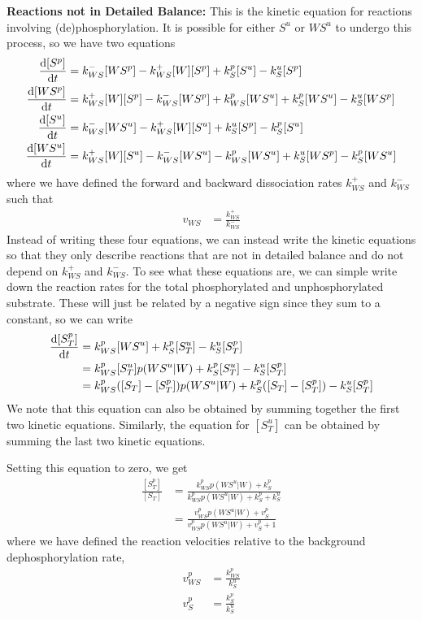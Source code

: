 \documentclass[aps,onecolumn,superscriptaddress,notitlepage]{revtex4-1}
\begin{document}
\textbf{Reactions not in  Detailed Balance:}
This is the kinetic equation for reactions involving (de)phosphorylation. 
It is possible for either $S^u$ or $WS^u$ to undergo this process, so we have two equations
\begin{align}
\dv{[S^p]}{t} &=  k_{WS}^-[WS^p] - k_{WS}^+[W][S^p] + k_S^p[S^u] - k_S^u[S^p]\\
\dv{[WS^p]}{t} &= k_{WS}^+[W][S^p] -k_{WS}^-[WS^p] + k_{WS}^p[WS^u] + k_S^p[WS^u] - k_S^u[WS^p]\\
\dv{[S^u]}{t} &=  k_{WS}^-[WS^u] - k_{WS}^+[W][S^u] + k_S^u[S^p] - k_S^p[S^u]\\
\dv{[WS^u]}{t} &= k_{WS}^+[W][S^u] -k_{WS}^-[WS^u] - k_{WS}^p[WS^u] + k_S^u[WS^p] - k_S^p[WS^u]
\end{align}
where we have defined the forward and backward dissociation rates $k_{WS}^+$ and $k_{WS}^-$ such that
\begin{align}
v_{WS} &= \frac{k_{WS}^+}{k_{WS}^-}
\end{align}
Instead of writing these four equations, we can instead write the kinetic equations so that they only describe reactions that are not in detailed balance and do not depend on $k_{WS}^+$ and $k_{WS}^-$. To see what these equations are, we can simple write down the reaction rates for the total phosphorylated and unphosphorylated substrate.
These will just be related by a negative sign since they sum to a constant, so we can write
\begin{align}
\dv{[S^p_T]}{t} &= k_{WS}^p[WS^u] + k_S^p[S_T^u] - k_S^u[S_T^p]\\
&= k_{WS}^p[S_T^u]p(WS^u|W) + k_S^p[S_T^u] - k_S^u[S_T^p]\\
&= k_{WS}^p([S_T]-[S_T^p])p(WS^u|W) + k_S^p([S_T]-[S_T^p]) - k_S^u[S_T^p]
\end{align}
We note that this equation can also be obtained by summing together the first two kinetic equations. Similarly, the equation for $[S^u_T]$ can be obtained by summing the last two kinetic equations.


Setting this equation to zero, we get
\begin{align}
\frac{[S_T^p]}{[S_T]} &= \frac{k_{WS}^p p(WS^u|W) + k_S^p}{k_{WS}^p p(WS^u|W) + k_S^p+k_S^u}\\
& = \frac{v_{WS}^p p(WS^u|W) + v_S^p}{v_{WS}^p p(WS^u|W) + v_S^p+1}
\end{align}
where we have defined the reaction velocities relative to the background dephosphorylation rate,
\begin{align}
v_{WS}^p &= \frac{k_{WS}^p}{k_S^u}\\
v_S^p &= \frac{k_S^p}{k_S^u}
\end{align}
\end{document}
